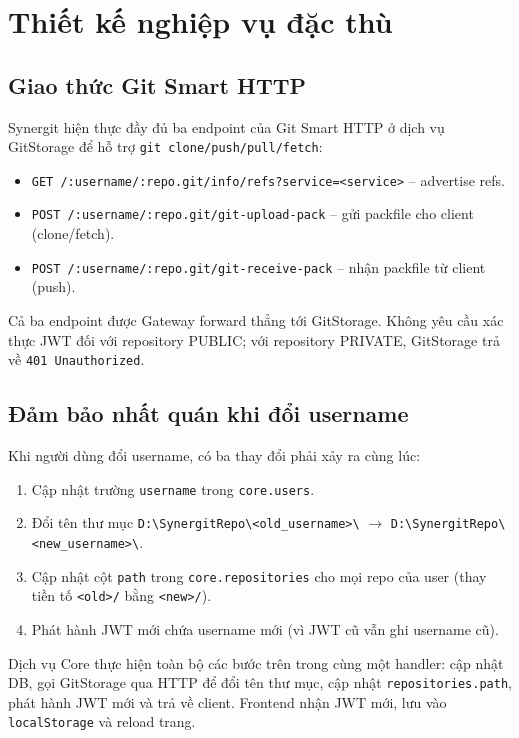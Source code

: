 \section{Thiết kế nghiệp vụ đặc thù}

\subsection{Giao thức Git Smart HTTP}
Synergit hiện thực đầy đủ ba endpoint của Git Smart HTTP ở dịch vụ GitStorage để hỗ trợ \texttt{git clone/push/pull/fetch}:

\begin{itemize}
\item \texttt{GET /:username/:repo.git/info/refs?service=<service>} -- advertise refs.
\item \texttt{POST /:username/:repo.git/git-upload-pack} -- gửi packfile cho client (clone/fetch).
\item \texttt{POST /:username/:repo.git/git-receive-pack} -- nhận packfile từ client (push).
\end{itemize}

Cả ba endpoint được Gateway forward thẳng tới GitStorage. Không yêu cầu xác thực JWT đối với repository PUBLIC; với repository PRIVATE, GitStorage trả về \texttt{401 Unauthorized}.

\subsection{Đảm bảo nhất quán khi đổi username}
Khi người dùng đổi username, có ba thay đổi phải xảy ra cùng lúc:

\begin{enumerate}
\item Cập nhật trường \texttt{username} trong \texttt{core.users}.
\item Đổi tên thư mục \texttt{D:\textbackslash SynergitRepo\textbackslash<old\_username>\textbackslash} $\to$ \texttt{D:\textbackslash SynergitRepo\textbackslash<new\_username>\textbackslash}.
\item Cập nhật cột \texttt{path} trong \texttt{core.repositories} cho mọi repo của user (thay tiền tố \texttt{<old>/} bằng \texttt{<new>/}).
\item Phát hành JWT mới chứa username mới (vì JWT cũ vẫn ghi username cũ).
\end{enumerate}

Dịch vụ Core thực hiện toàn bộ các bước trên trong cùng một handler: cập nhật DB, gọi GitStorage qua HTTP để đổi tên thư mục, cập nhật \texttt{repositories.path}, phát hành JWT mới và trả về client. Frontend nhận JWT mới, lưu vào \texttt{localStorage} và reload trang.


